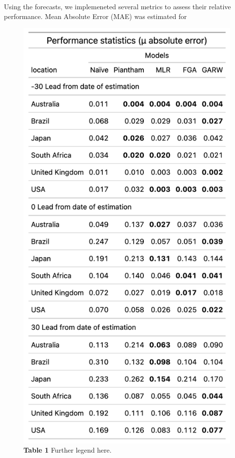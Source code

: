 \documentclass[11pt,oneside,letterpaper]{article}
\begin{document}
Using the forecasts, we implemeneted several metrics to assess their relative performance.
Mean Absolute Error (MAE) was estimated for 






% 




%



\begin{figure}[h]
	\centering
	\includegraphics[width=1.0\textwidth]{figures/table1.png}
	\caption{\textbf{Table 1}
	Further legend here.
	}
	\label{table1}
\end{figure}
\end{document}

